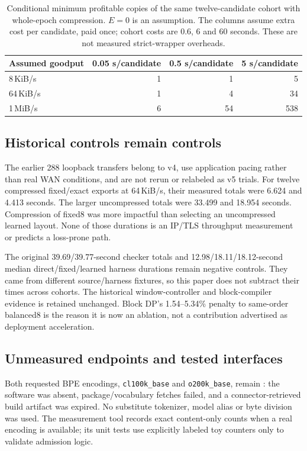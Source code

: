 \begin{table}[t]\centering\small
\caption{Conditional minimum profitable copies of the same twelve-candidate cohort with whole-epoch compression. $E=0$ is an assumption. The columns assume extra cost per candidate, paid once; cohort costs are 0.6, 6 and 60 seconds. These are not measured strict-wrapper overheads.}\label{tab:qmin}
\begin{tabularx}{\linewidth}{@{}l r r r@{}}\toprule
Assumed goodput & 0.05 s/candidate & 0.5 s/candidate & 5 s/candidate\\\midrule
8\,KiB/s & 1 & 1 & 5\\
64\,KiB/s & 1 & 4 & 34\\
1\,MiB/s & 6 & 54 & 538\\
\bottomrule\end{tabularx}\end{table}

\subsection{Historical controls remain controls}\label{sec:controls}
The earlier 288 loopback transfers belong to v4, use application pacing rather
than real WAN conditions, and are not rerun or relabeled as v5 trials. For twelve
compressed fixed/exact exports at 64\,KiB/s, their measured totals were 6.624 and
4.413 seconds. The larger uncompressed totals were 33.499 and 18.954 seconds.
Compression of fixed8 was more impactful than selecting an uncompressed learned
layout. None of those durations is an IP/TLS throughput measurement or predicts a
loss-prone path.

The original 39.69/39.77-second checker totals and 12.98/18.11/18.12-second
median direct/fixed/learned harness durations remain negative controls. They came
from different source/harness fixtures, so this paper does not subtract their
times across cohorts. The historical window-controller and block-compiler
evidence is retained unchanged. Block DP's 1.54--5.34\% penalty to same-order
balanced8 is the reason it is now an ablation, not a contribution advertised as
deployment acceleration.

\subsection{Unmeasured endpoints and tested interfaces}\label{sec:unmeasured}
Both requested BPE encodings, \texttt{cl100k\_base} and
\texttt{o200k\_base}, remain \UNKNOWN{}: the software was absent,
package/vocabulary fetches failed, and a connector-retrieved build artifact was
expired. No substitute tokenizer, model alias or byte division was used. The
measurement tool records exact content-only counts when a real encoding is
available; its unit tests use explicitly labeled toy counters only to validate
admission logic.

